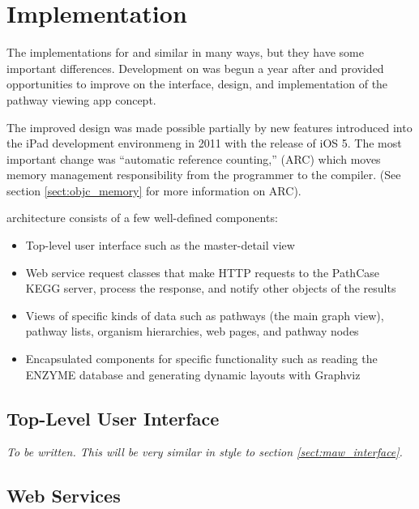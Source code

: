 \section{Implementation}
\label{sect:kegg_implementation}

The implementations for \mawapp and \keggapp similar in many ways, but they have
some important differences. Development on \keggapp was begun a year after
\mawapp and provided opportunities to improve on the interface, design, and
implementation of the pathway viewing app concept.

The improved design was made possible partially by new features introduced into
the iPad development environmeng in 2011 with the release of iOS 5. The most
important change was ``automatic reference counting,'' (ARC) which moves memory
management responsibility from the programmer to the compiler. (See section
\ref{sect:objc_memory} for more information on ARC).

\keggappp architecture consists of a few well-defined components:

\begin{itemize}

    \item Top-level user interface such as the master-detail view
    
    \item Web service request classes that make HTTP requests to the PathCase
        KEGG server, process the response, and notify other objects of the
        results

    \item Views of specific kinds of data such as pathways (the main graph
        view), pathway lists, organism hierarchies, web pages, and pathway nodes

    \item Encapsulated components for specific functionality such as reading the
        ENZYME database and generating dynamic layouts with Graphviz

\end{itemize}

\subsection{Top-Level User Interface}
\label{sect:kegg_impl_top_level_ui}

\emph{To be written. This will be very similar in style to section
\ref{sect:maw_interface}.}

\subsection{Web Services}
\label{sect:kegg_impl_web_services}

